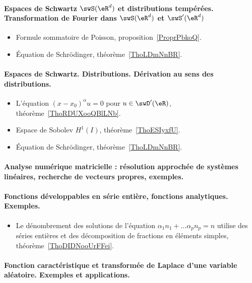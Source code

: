 \paragraph{Espaces de Schwartz \( \swS(\eR^d)\) et distributions tempérées. Transformation de Fourier dans \( \swS(\eR^d)\) et \( \swS'(\eR^d)\)}
\begin{itemize}
    \item Formule sommatoire de Poisson, proposition~\ref{ProprPbkoQ}.
    \item Équation de Schrödinger, théorème~\ref{ThoLDmNnBR}.
\end{itemize}
\paragraph{Espaces de Schwartz. Distributions. Dérivation au sens des distributions.}
\begin{itemize}
    \item L'équation \( (x-x_0)^{\alpha}u=0\) pour \( u\in\swD'(\eR)\), théorème~\ref{ThoRDUXooQBlLNb}.
    \item Espace de Sobolev \( H^1(I)\), théorème~\ref{ThoESIyxfU}.
    \item Équation de Schrödinger, théorème~\ref{ThoLDmNnBR}.
\end{itemize}

\paragraph{Analyse numérique matricielle : résolution approchée de systèmes linéaires, recherche de vecteurs propres, exemples.}
\paragraph{Fonctions développables en série entière, fonctions analytiques. Exemples.}
\begin{itemize}
    \item Le dénombrement des solutions de l'équation \( \alpha_1 n_1+\ldots \alpha_pn_p=n\) utilise des séries entières et des décomposition de fractions en éléments simples, théorème~\ref{ThoDIDNooUrFFei}.
\end{itemize}
\paragraph{Fonction caractéristique et transformée de Laplace d'une variable aléatoire. Exemples et applications.}
